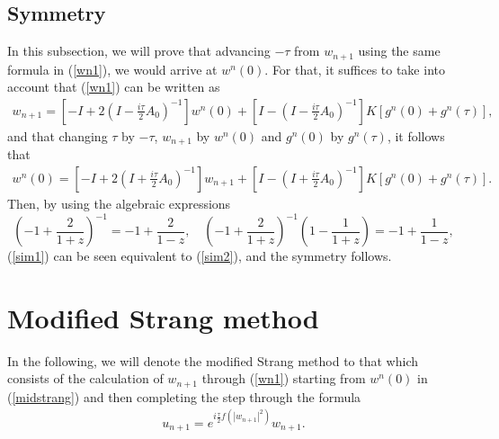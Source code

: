 \documentclass[a4paper,12pt]{article}
\begin{document}
\subsection{Symmetry}
In this subsection, we will prove that advancing $-\tau$ from $w_{n+1}$ using the same formula in (\ref{wn1}), we would arrive at $w^n(0)$.
For that, it suffices to take into account that (\ref{wn1}) can be written as
\begin{eqnarray}
w_{n+1}=[-I +2(I-\frac{i \tau}{2}A_0)^{-1}]w^n(0)+[I-(I-\frac{i \tau}{2}A_0)^{-1}]K [g^n(0)+g^n(\tau)],
\label{sim1}
\end{eqnarray}
and that changing $\tau$ by $-\tau$, $w_{n+1}$ by $w^n(0)$ and $g^n(0)$ by $g^n(\tau)$, it follows that
\begin{eqnarray}
w^n(0)=[-I +2(I+\frac{i \tau}{2}A_0)^{-1}]w_{n+1}+[I-(I+\frac{i \tau}{2}A_0)^{-1}]K [g^n(0)+g^n(\tau)].
\label{sim2}
\end{eqnarray}
Then, by using the algebraic expressions
$$
(-1+\frac{2}{1+z})^{-1}=-1+\frac{2}{1-z}, \quad (-1+\frac{2}{1+z})^{-1}(1-\frac{1}{1+z})=-1+\frac{1}{1-z},$$
(\ref{sim1}) can be seen equivalent to (\ref{sim2}), and the symmetry follows.






\section{Modified Strang method}



In the following, we will denote the modified Strang method to that which consists of the calculation of $w_{n+1}$ through (\ref{wn1}) starting from $w^n(0)$ in (\ref{midstrang}) and then completing the step through the formula
\begin{eqnarray}
u_{n+1}=e^{i \frac{\tau}{2}f(|w_{n+1}|^2)} w_{n+1}. \label{finalu}
\end{eqnarray}
\end{document}
